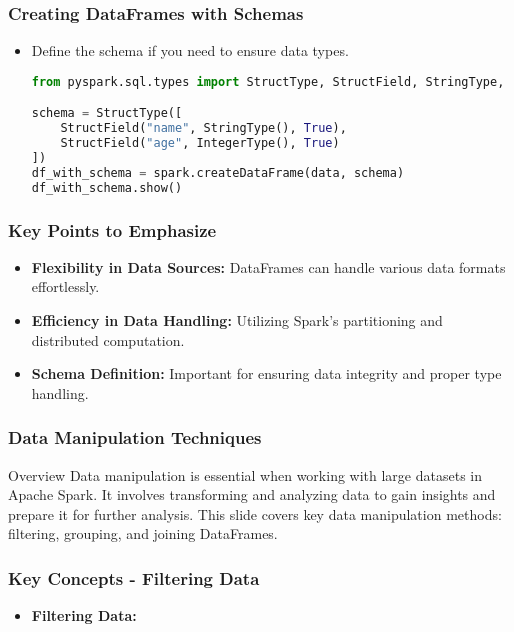 \documentclass[aspectratio=169]{beamer}
\begin{document}
\begin{frame}[fragile]
    \frametitle{Creating DataFrames with Schemas}
    \begin{itemize}
        \item Define the schema if you need to ensure data types.
        \begin{lstlisting}[language=Python]
from pyspark.sql.types import StructType, StructField, StringType, IntegerType

schema = StructType([
    StructField("name", StringType(), True),
    StructField("age", IntegerType(), True)
])
df_with_schema = spark.createDataFrame(data, schema)
df_with_schema.show()
        \end{lstlisting}
    \end{itemize}
\end{frame}

\begin{frame}
    \frametitle{Key Points to Emphasize}
    \begin{itemize}
        \item \textbf{Flexibility in Data Sources:} DataFrames can handle various data formats effortlessly.
        \item \textbf{Efficiency in Data Handling:} Utilizing Spark’s partitioning and distributed computation.
        \item \textbf{Schema Definition:} Important for ensuring data integrity and proper type handling.
    \end{itemize}
\end{frame}

\begin{frame}
    \frametitle{Data Manipulation Techniques}
    \begin{block}{Overview}
        Data manipulation is essential when working with large datasets in Apache Spark. 
        It involves transforming and analyzing data to gain insights and prepare it for further analysis.
        This slide covers key data manipulation methods: filtering, grouping, and joining DataFrames.
    \end{block}
\end{frame}

\begin{frame}[fragile]
    \frametitle{Key Concepts - Filtering Data}
    \begin{itemize}
        \item \textbf{Filtering Data:}
    \end{itemize}
\end{frame}
\end{document}
